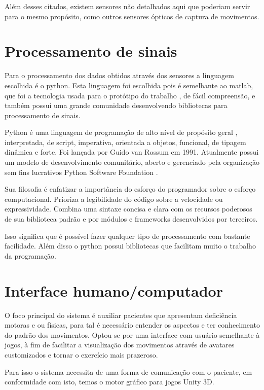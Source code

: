    Além desses citados, existem sensores
não detalhados aqui que poderiam servir para o mesmo propósito, como outros sensores ópticos de captura de movimentos.

\section{Processamento de sinais}
\label{Sec:Processamento de sinais}
  Para o processamento dos dados obtidos através dos sensores a 
linguagem escolhida é o python. Esta linguagem foi escolhida pois é semelhante ao matlab,
que foi a tecnologia usada para o protótipo do trabalho \cite{roberto}, de fácil compreensão, e também possui uma grande comunidade desenvolvendo bibliotecas
para processamento de sinais.

  Python é uma linguagem de programação de alto nível de propósito geral \cite{python} , 
interpretada, de script, imperativa, orientada a objetos, funcional, de tipagem 
dinâmica e forte. Foi lançada por Guido van Rossum em 1991.\cite{historiaPython} Atualmente possui
 um modelo de desenvolvimento comunitário, aberto e gerenciado pela organização
 sem fins lucrativos Python Software Foundation \cite{pythonFoudation}.

Sua filosofia é enfatizar a importância do esforço do programador sobre o esforço
 computacional. Prioriza a legibilidade do código sobre a velocidade ou 
expressividade. Combina uma sintaxe concisa e clara com os recursos poderosos de
 sua biblioteca padrão e por módulos e frameworks desenvolvidos por terceiros.

Isso significa que é possível fazer qualquer tipo de processamento com bastante
 facilidade. Além disso o python possui bibliotecas que facilitam muito o trabalho da programação.

\section{Interface humano/computador}
\label{Sec:Interface humano/computador}
  O foco principal do sistema é auxiliar pacientes que apresentam deficiência 
motoras e ou físicas, para tal é necessário entender os aspectos e
ter conhecimento do padrão dos movimentos. 
Optou-se por uma interface com usuário semelhante à jogos, à fim de facilitar a visualização dos movimentos através de avatares customizados e tornar o exercício mais prazeroso.


Para isso o sistema necessita
de uma forma de comunicação com o paciente, em conformidade com isto, 
temos o motor gráfico para jogos Unity 3D.
  
